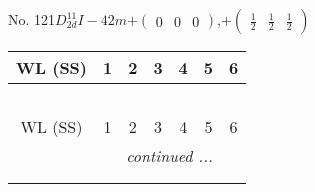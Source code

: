 \documentclass[fleqn,9pt,landscape]{jsarticle}
\begin{document}
\newpage
No. 121\quad$D_{2d}^{11}$\quad$I-42m$\quad[ tetragonal ]\quad$+\begin{pmatrix} 0 & 0 & 0 \end{pmatrix}$,\quad $+\begin{pmatrix} \frac{1}{2} & \frac{1}{2} & \frac{1}{2} \end{pmatrix}$
\begin{center}
\renewcommand{\arraystretch}{1.2}
\begin{longtable}{ccccccc}
 \hline \hline
WL (SS) & 1 & 2 & 3 & 4 & 5 & 6 \\ \hline \endfirsthead

\multicolumn{6}{l}{\tablename\ \thetable{}} \\
 \hline \hline
WL (SS) & 1 & 2 & 3 & 4 & 5 & 6 \\ \hline \endhead

 \hline \hline
\multicolumn{6}{r}{\footnotesize\it continued ...} \\ \endfoot

 \hline \hline
\multicolumn{6}{r}{} \\ \endlastfoot


\end{longtable}
\end{center}
\end{document}
